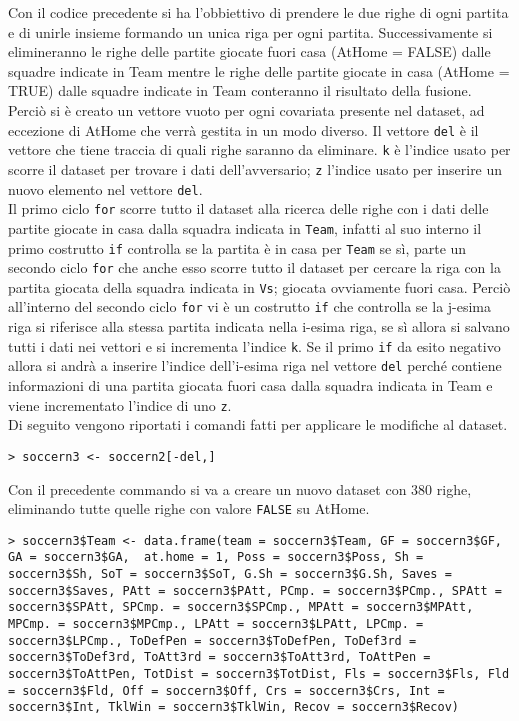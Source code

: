 Con il codice precedente si ha l'obbiettivo di prendere le due righe di ogni partita e di unirle insieme formando un unica riga per ogni partita. Successivamente si elimineranno le righe delle partite giocate fuori casa (\textsf{AtHome} = FALSE) dalle squadre indicate in \textsf{Team} mentre le righe delle partite giocate in casa (\textsf{AtHome} = TRUE) dalle squadre indicate in \textsf{Team} conteranno il risultato della fusione.\\
Perciò si è creato un vettore vuoto per ogni covariata presente nel dataset, ad eccezione di \textsf{AtHome} che verrà gestita in un modo diverso. Il vettore \texttt{del} è il vettore che tiene traccia di quali righe saranno da eliminare. \texttt{k} è l'indice usato per scorre il dataset per trovare i dati dell'avversario; \texttt{z} l'indice usato per inserire un nuovo elemento nel vettore \texttt{del}.\\
Il primo ciclo \texttt{for} scorre tutto il dataset alla ricerca delle righe con i dati delle partite giocate in casa dalla squadra indicata in \texttt{Team}, infatti al suo interno il primo costrutto \texttt{if} controlla se la partita è in casa per \texttt{Team} se sì, parte un secondo ciclo \texttt{for} che anche esso scorre tutto il dataset per cercare la riga con la partita giocata della squadra indicata in \texttt{Vs}; giocata ovviamente fuori casa. Perciò all'interno del secondo ciclo \texttt{for} vi è un costrutto \texttt{if} che controlla se la j-esima riga si riferisce alla stessa partita indicata nella i-esima riga, se sì allora si salvano tutti i dati nei vettori e si incrementa l'indice \texttt{k}. Se il primo \texttt{if} da esito negativo allora si andrà a inserire l'indice dell'i-esima riga nel vettore \texttt{del} perché contiene informazioni di una partita giocata fuori casa dalla squadra indicata in \textsf{Team} e viene incrementato l'indice di uno \texttt{z}.\\

Di seguito vengono riportati i comandi fatti per applicare le modifiche al dataset.
\bigskip
\begin{lstlisting}
> soccern3 <- soccern2[-del,]
\end{lstlisting}
\bigskip
\bigskip
Con il precedente commando si va a creare un nuovo dataset con 380 righe, eliminando tutte quelle righe con valore \texttt{FALSE} su \textsf{AtHome}. 
\bigskip
\begin{lstlisting}
> soccern3$Team <- data.frame(team = soccern3$Team, GF = soccern3$GF, GA = soccern3$GA,  at.home = 1, Poss = soccern3$Poss, Sh = soccern3$Sh, SoT = soccern3$SoT, G.Sh = soccern3$G.Sh, Saves = soccern3$Saves, PAtt = soccern3$PAtt, PCmp. = soccern3$PCmp., SPAtt = soccern3$SPAtt, SPCmp. = soccern3$SPCmp., MPAtt = soccern3$MPAtt, MPCmp. = soccern3$MPCmp., LPAtt = soccern3$LPAtt, LPCmp. = soccern3$LPCmp., ToDefPen = soccern3$ToDefPen, ToDef3rd = soccern3$ToDef3rd, ToAtt3rd = soccern3$ToAtt3rd, ToAttPen = soccern3$ToAttPen, TotDist = soccern3$TotDist, Fls = soccern3$Fls, Fld = soccern3$Fld, Off = soccern3$Off, Crs = soccern3$Crs, Int = soccern3$Int, TklWin = soccern3$TklWin, Recov = soccern3$Recov)
	
\end{lstlisting}

